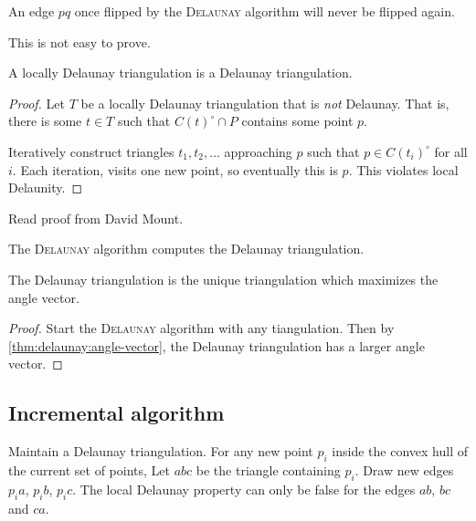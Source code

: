 \begin{fact}
    An edge $pq$ once flipped by the \textsc{Delaunay} algorithm will never
    be flipped again.
\end{fact}
This is not easy to prove.

\begin{theorem}
    A locally Delaunay triangulation is a Delaunay triangulation.
\end{theorem}
\begin{proof}
    Let $T$ be a locally Delaunay triangulation that is \emph{not} Delaunay.
    That is, there is some $t \in T$ such that $C(t)^\circ \cap P$ contains
    some point $p$.

    Iteratively construct triangles $t_1, t_2, \ldots$ approaching $p$
    such that $p \in C(t_i)^\circ$ for all $i$.
    Each iteration, visits one new point, so eventually this is $p$.
    This violates local Delaunity.
\end{proof}
Read proof from David Mount.

\begin{corollary}
    The \textsc{Delaunay} algorithm computes the Delaunay triangulation.
\end{corollary}

\begin{corollary}
    The Delaunay triangulation is the unique triangulation which maximizes
    the angle vector.
\end{corollary}
\begin{proof}
    Start the \textsc{Delaunay} algorithm with any tiangulation.
    Then by \cref{thm:delaunay:angle-vector}, the Delaunay triangulation
    has a larger angle vector.
\end{proof}

\subsection{Incremental algorithm} \label{sec:delaunay:incremental}
Maintain a Delaunay triangulation.
For any new point $p_i$ inside the convex hull of the current set of points,
Let $abc$ be the triangle containing $p_i$.
Draw new edges $p_ia$, $p_ib$, $p_ic$.
The local Delaunay property can only be false for the edges $ab$, $bc$ and
$ca$.

